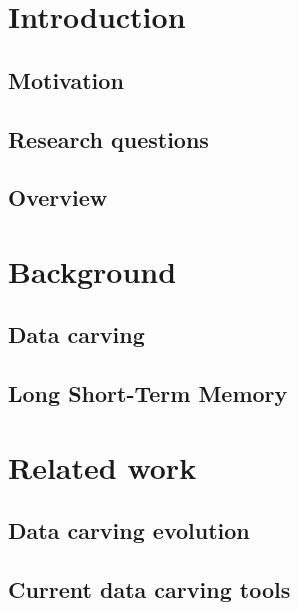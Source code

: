 
\listoftodos

\section{\label{chap:introduction}Introduction}

    \subsection{Motivation}
    
    \subsection{Research questions}
    
    \subsection{Overview}
    

\section{\label{chap:background}Background}

    \subsection{\label{sec:datacarving}Data carving}
    

    \subsection{\label{sec:lstm}Long Short-Term Memory}
    

\section{Related work}

    \subsection{Data carving evolution}
    
    \subsection{Current data carving tools}
    
